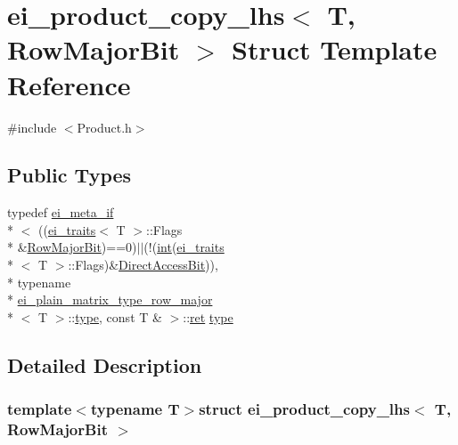 \hypertarget{structei__product__copy__lhs_3_01_t_00_01_row_major_bit_01_4}{\section{ei\-\_\-product\-\_\-copy\-\_\-lhs$<$ T, Row\-Major\-Bit $>$ Struct Template Reference}
\label{structei__product__copy__lhs_3_01_t_00_01_row_major_bit_01_4}
}


{\ttfamily \#include $<$Product.\-h$>$}

\subsection*{Public Types}
\begin{DoxyCompactItemize}
\item 
typedef \hyperlink{structei__meta__if}{ei\-\_\-meta\-\_\-if}\\*
$<$ ((\hyperlink{structei__traits}{ei\-\_\-traits}$<$ T $>$\-::Flags \\*
\&\hyperlink{group__flags_ga7bd49e7b260e869e10fb9dc4fd081a85}{Row\-Major\-Bit})==0)$|$$|$(!(\hyperlink{ioapi_8h_a787fa3cf048117ba7123753c1e74fcd6}{int}(\hyperlink{structei__traits}{ei\-\_\-traits}\\*
$<$ T $>$\-::Flags)\&\hyperlink{group__flags_ga54c3b872f5a14e7e0d3d6539b704ea67}{Direct\-Access\-Bit})), \\*
typename \\*
\hyperlink{structei__plain__matrix__type__row__major}{ei\-\_\-plain\-\_\-matrix\-\_\-type\-\_\-row\-\_\-major}\\*
$<$ T $>$\-::\hyperlink{structei__product__copy__lhs_3_01_t_00_01_row_major_bit_01_4_ae94777967be0382daa931ac3d428d047}{type}, const T \& $>$\-::\hyperlink{group___i_p_conn_plugin_gabc99fe6afec1a75ccff1092e47375a40}{ret} \hyperlink{structei__product__copy__lhs_3_01_t_00_01_row_major_bit_01_4_ae94777967be0382daa931ac3d428d047}{type}
\end{DoxyCompactItemize}


\subsection{Detailed Description}
\subsubsection*{template$<$typename T$>$struct ei\-\_\-product\-\_\-copy\-\_\-lhs$<$ T, Row\-Major\-Bit $>$}




